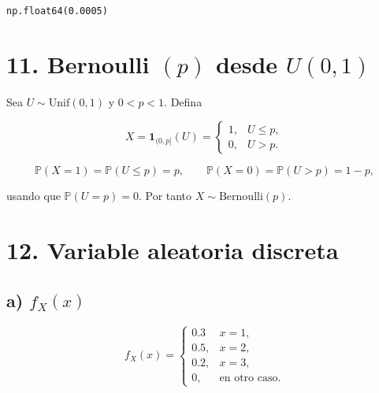 \documentclass[10pt,a4paper]{article}
\makeatletter
\newcommand{\boxspacing}{\kern\kvtcb@left@rule\kern\kvtcb@boxsep}
\newcommand{\prompt}[4]{
        {\ttfamily\llap{{\color{#2}[#3]:\hspace{3pt}#4}}\vspace{-\baselineskip}}
    }
\makeatother
\begin{document}
            \begin{tcolorbox}[breakable, size=fbox, boxrule=.5pt, pad at break*=1mm, opacityfill=0]
\prompt{Out}{outcolor}{18}{\boxspacing}
\begin{Verbatim}[commandchars=\\\{\}]
np.float64(0.0005)
\end{Verbatim}
\end{tcolorbox}
        
    \hypertarget{bernoulli-p-desde-u01}{%
\section{\texorpdfstring{11. Bernoulli \((p)\) desde
\(U(0,1)\)}{11. Bernoulli (p) desde U(0,1)}}\label{bernoulli-p-desde-u01}}

    Sea \textbf{\(U\sim\mathrm{Unif}(0,1)\)} y \(0<p<1\). Defina

\[
X=\mathbf 1_{(0,p]}(U)=
\begin{cases}
1,& U\leq p,\\
0,& U>p.
\end{cases}
\]

\[
\mathbb P(X=1)=\mathbb P(U\leq p)=p,\qquad
\mathbb P(X=0)=\mathbb P(U>p)=1-p,
\]

usando que \(\mathbb P(U=p)=0\). Por tanto
\(X\sim \mathrm{Bernoulli}(p)\).

    \hypertarget{variable-aleatoria-discreta}{%
\section{12. Variable aleatoria
discreta}\label{variable-aleatoria-discreta}}

    \hypertarget{a-grafica-de-f_xx}{%
\subsection{\texorpdfstring{a) 
\(f_X(x)\)}{a) f\_X(x)}}\label{a-grafica-de-f_xx}}

    \[
f_X(x)=
\begin{cases}
0.3& x=1,\\
0.5,& x=2,\\
0.2,& x=3,\\
0,& \text{en otro caso.}
\end{cases}
\]
\end{document}
